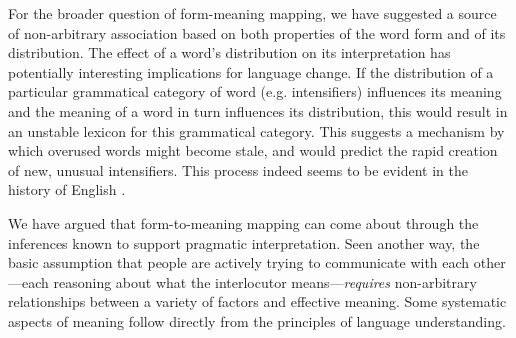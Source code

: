\documentclass[10pt,letterpaper]{article}
\newcommand{\todo}[1]{{\color{red}#1}}
\begin{document}
For the broader question of form-meaning mapping, we have suggested a source of non-arbitrary association based on both properties of the word form and of its distribution.
The effect of a word's distribution on its interpretation has potentially interesting implications for language change.
If the distribution of a particular grammatical category of word (e.g. intensifiers) influences its meaning and the meaning of a word in turn influences its distribution, this would result in an unstable lexicon for this grammatical category.
This suggests a mechanism by which overused words might become stale, and would predict the rapid creation of new, unusual intensifiers.
This process indeed seems to be evident in the history of English \cite{bolinger_degree_1972}.

We have argued that form-to-meaning mapping can come about through the inferences known to support pragmatic interpretation.
Seen another way, the basic assumption that people are actively trying to communicate with each other---each reasoning about what the interlocutor means---\emph{requires} non-arbitrary relationships between a variety of factors and effective meaning.
Some systematic aspects of meaning follow directly from the principles of language understanding.

\end{document}
